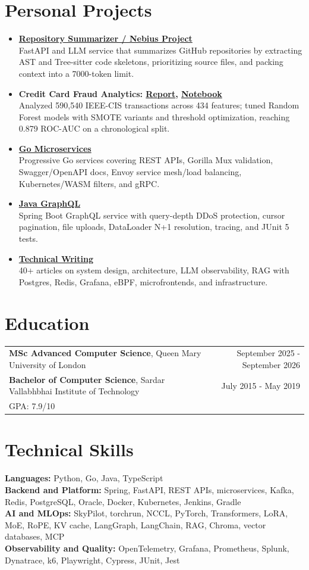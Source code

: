 \documentclass[10pt,a4paper]{article}
\newcommand{\resumeProjectHeading}[2]{%
  \item \textbf{#1}\\
  #2
}
\newcommand{\skill}[2]{\textbf{#1:} #2\\}
\begin{document}
\section{Personal Projects}
\begin{itemize}
  \resumeProjectHeading{\href{https://github.com/aymanapatel/nebius-project}{Repository Summarizer / Nebius Project}}{FastAPI and LLM service that summarizes GitHub repositories by extracting AST and Tree-sitter code skeletons, prioritizing source files, and packing context into a 7000-token limit.}
  \resumeProjectHeading{Credit Card Fraud Analytics: \href{https://github.com/aymanapatel/qmul-all-projects/blob/main/data-analytics/coursework1/credit-card-report.pdf}{Report}, \href{https://github.com/aymanapatel/qmul-all-projects/blob/main/data-analytics/coursework1/credit-card-notebook.ipynb}{Notebook}}{Analyzed 590,540 IEEE-CIS transactions across 434 features; tuned Random Forest models with SMOTE variants and threshold optimization, reaching 0.879 ROC-AUC on a chronological split.}
  \resumeProjectHeading{\href{https://github.com/aymanapatel/golang-microservices}{Go Microservices}}{Progressive Go services covering REST APIs, Gorilla Mux validation, Swagger/OpenAPI docs, Envoy service mesh/load balancing, Kubernetes/WASM filters, and gRPC.}
  \resumeProjectHeading{\href{https://github.com/aymanapatel/java-graphql}{Java GraphQL}}{Spring Boot GraphQL service with query-depth DDoS protection, cursor pagination, file uploads, DataLoader N+1 resolution, tracing, and JUnit 5 tests.}
  \resumeProjectHeading{\href{https://aymanace2049.hashnode.dev}{Technical Writing}}{40+ articles on system design, architecture, LLM observability, RAG with Postgres, Redis, Grafana, eBPF, microfrontends, and infrastructure.}
\end{itemize}

\section{Education}
\begin{tabularx}{\textwidth}{@{}Xr@{}}
\textbf{MSc Advanced Computer Science}, Queen Mary University of London & September 2025 - September 2026\\
\textbf{Bachelor of Computer Science}, Sardar Vallabhbhai Institute of Technology & July 2015 - May 2019\\
GPA: 7.9/10 &
\end{tabularx}

\section{Technical Skills}
\skill{Languages}{Python, Go, Java, TypeScript}
\skill{Backend and Platform}{Spring, FastAPI, REST APIs, microservices, Kafka, Redis, PostgreSQL, Oracle, Docker, Kubernetes, Jenkins, Gradle}
\skill{AI and MLOps}{SkyPilot, torchrun, NCCL, PyTorch, Transformers, LoRA, MoE, RoPE, KV cache, LangGraph, LangChain, RAG, Chroma, vector databases, MCP}
\skill{Observability and Quality}{OpenTelemetry, Grafana, Prometheus, Splunk, Dynatrace, k6, Playwright, Cypress, JUnit, Jest}
\end{document}
